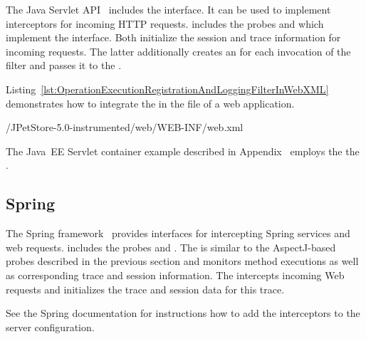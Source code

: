 The Java Servlet API~\cite{JavaServletTechnology-WebSite} includes the %
 interface. It can be used to implement %
interceptors for incoming HTTP requests. %
\Kieker{} includes the probes %
 and %
 which implement the %
 interface. %
Both initialize the session and trace information for incoming requests. %
The latter additionally creates an  for each %
invocation of the filter and passes it to the .

\enlargethispage{1.5cm}

Listing~\ref{lst:OperationExecutionRegistrationAndLoggingFilterInWebXML} %
demonstrates how to integrate the  %
in the  file of a web application. 

\setXMLListing
%
{\JavaEEServletExampleDir/JPetStore-5.0-instrumented/web/WEB-INF/web.xml}

\noindent The Java~EE Servlet container example described in Appendix~\label{appendix:JavaEEServletExample} employs the %
the .

\subsection{Spring}\label{sec:traceAnalysis:instr:spring}

The Spring framework~\cite{Spring-WebSite} provides interfaces for intercepting %
Spring services and web requests. %
\Kieker{} includes the probes %
 and
. %
The  is similar to the %
AspectJ-based probes described in the previous section and monitors method %
executions as well as corresponding trace and session information. %
The  intercepts %
incoming Web requests and initializes the trace and session data for this %
trace.

See the Spring documentation for instructions how to add the interceptors %
to the server configuration.

